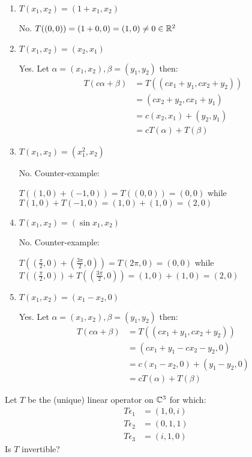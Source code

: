 \documentclass[a4paper, 11pt]{article}
\begin{document}
\begin{solution}
    \begin{enumerate} [label=(\alph*)]
        \item \(T(x_1, x_2) = (1 + x_1, x_2)\)

        No. \(T((0, 0)) = (1 + 0, 0) = (1, 0) \neq 0 \in \mathbb{R}^2\)
        \item \(T(x_1, x_2) = (x_2, x_1)\)
        
        Yes. Let \(\alpha = (x_1, x_2), \beta = (y_1, y_2)\) then: 
        \begin{align*}
            T(c\alpha + \beta) &= T((cx_1 + y_1, cx_2 + y_2)) \\
            &= (cx_2 + y_2, cx_1 + y_1) \\
            &= c(x_2, x_1) + (y_2, y_1) \\
            &= cT(\alpha) + T(\beta)
        \end{align*}
        \item \(T(x_1, x_2) = (x_1^2, x_2)\)
        
        No. Counter-example:

        \(T((1,0) + (-1, 0)) = T((0, 0)) = (0, 0)\) while \(T(1,0) + T(-1,0) = (1,0) + (1,0) = (2,0)\)
        \item \(T(x_1, x_2) = (\sin x_1, x_2)\)
        
        No. Counter-example:

        \(T((\frac{\pi}{2}, 0) + (\frac{3\pi}{2}, 0)) = T(2\pi, 0) = (0, 0)\) while \(T((\frac{\pi}{2}, 0)) + T((\frac{3\pi}{2}, 0)) = (1, 0) + (1,0) = (2,0)\)
        \item \(T(x_1, x_2) = (x_1 - x_2, 0)\)
        
        Yes. Let \(\alpha = (x_1, x_2), \beta = (y_1, y_2)\) then: 
        \begin{align*}
            T(c\alpha + \beta) &= T((cx_1 + y_1, cx_2 + y_2)) \\
            &= (cx_1 + y_1 - cx_2 - y_2, 0) \\
            &= c(x_1 - x_2, 0) + (y_1-y_2, 0) \\
            &= cT(\alpha) + T(\beta)
        \end{align*}
    \end{enumerate}
\end{solution}
\begin{problem} 
    Let \(T\) be the (unique) linear operator on \(\mathbb{C}^3\) for which:
    \begin{align*}
        T\epsilon_1 &=(1, 0, i) \\
        T\epsilon_2 &=(0, 1, 1) \\
        T\epsilon_3 &=(i, 1, 0)
    \end{align*}
    Is \(T\) invertible?
\end{problem}
\end{document}
